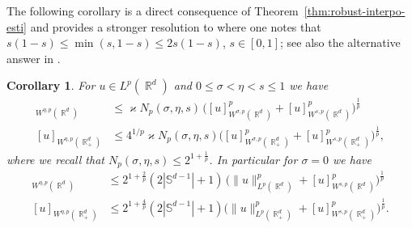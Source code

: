 \documentclass[12pt, reqno]{amsart}%
\theoremstyle{plain}  %
\newtheorem{corollary}[theorem]{Corollary}
\theoremstyle{definition}  %
\theoremstyle{remark}
\numberwithin{equation}{section}
\DeclareMathOperator{\R}{\mathbb{R}}
\begin{document}
The following corollary is a direct consequence of Theorem~\ref{thm:robust-interpo-esti} and provides a stronger resolution to \cite[Open Problem 1.10]{BSY22} where one notes that $s(1-s)\leq\min(s,1-s)\leq 2s(1-s)$, $s\in [0,1]$;  see also the alternative answer in \cite[Theorem 3.9]{DoMi23}.
\begin{corollary}
\label{cor:open-question}
For $u\in L^p(\R^d)$ and $0\leq \sigma<\eta<s\leq 1$ we have
\begin{align*}
[u]_{W^{\eta,p}(\R^d)}
&\leq
\varkappa N_p(\sigma,\eta,s)
\,\big([u]^p_{W^{\sigma,p}(\R^d)} +[u]^p_{W^{s,p}(\R^d)}\big)^{\frac{1}{p}}\\
[u]_{W^{\eta,p}(\R^d_+)}
&\leq
4^{1/p}\varkappa N_p(\sigma,\eta,s)
\big( [u]^p_{W^{\sigma,p}(\R^d_+)} + [u]^p_{W^{s,p}(\R^d_+)}
\big)^{\frac{1}{p}},
\end{align*}
where we recall that $N_p(\sigma,\eta,s)\leq 2^{1+\frac{1}{p}}$.  In particular for $\sigma=0$ we have
\begin{align*}
[u]_{W^{\eta,p}(\R^d)} &\leq
2^{1+\frac{2}{p}} (2|\mathbb{S}^{d-1}|+1)
\,\big(\|u\|^p_{L^p(\R^d)} +[u]^p_{W^{s,p}(\R^d)}\big)^{\frac{1}{p}}\\
[u]_{W^{\eta,p}(\R^d_+)} &\leq
2^{1+\frac{4}{p}} (2|\mathbb{S}^{d-1}|+1)
\big( \|u\|^p_{L^p(\R^d_+)} + [u]^p_{W^{s,p}(\R^d_+)}
\big)^{\frac{1}{p}}.
\end{align*}
\end{corollary}

\end{document}
